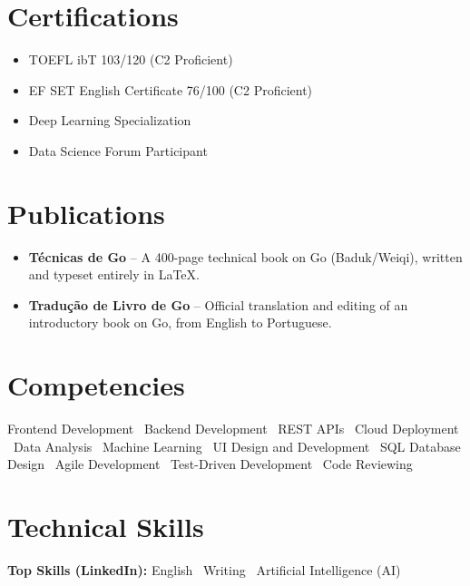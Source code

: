 \documentclass[12pt]{extarticle}
\renewcommand{\_}{\leavevmode\kern.06em\vbox{\hrule width.425em}}
\begin{document}
\noindent
\begin{minipage}[t]{0.48\textwidth}
\section{Certifications}

\begin{itemize}
  \item TOEFL ibT 103/120 (C2 Proficient)
  \item EF SET English Certificate 76/100 (C2 Proficient)
  \item Deep Learning Specialization
  \item Data Science Forum Participant
\end{itemize}
\end{minipage}%
\hfill
\begin{minipage}[t]{0.48\textwidth}
\section{Publications}

\begin{itemize}
  \item \textbf{T\'ecnicas de Go} -- A 400-page technical book on Go (Baduk/Weiqi), written and typeset entirely in \LaTeX.
  \item \textbf{Tradu\c{c}\~ao de Livro de Go} -- Official translation and editing of an introductory book on Go, from English to Portuguese.
\end{itemize}
\end{minipage}

\section{Competencies}

Frontend Development \textbullet\ Backend Development \textbullet\ REST APIs \textbullet\ Cloud Deployment \textbullet\ Data Analysis \textbullet\ Machine Learning \textbullet\ UI Design and Development \textbullet\ SQL Database Design \textbullet\ Agile Development \textbullet\ Test-Driven Development \textbullet\ Code Reviewing

\section{Technical Skills}

\textbf{Top Skills (LinkedIn):} English \textbullet\ Writing \textbullet\ Artificial Intelligence (AI)
\end{document}

